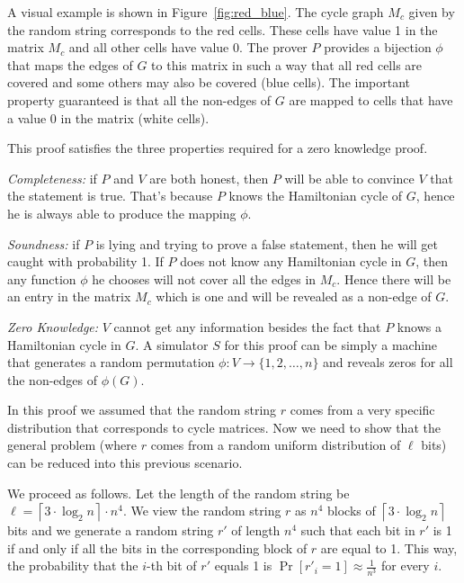 \documentclass[12pt]{tufte-book}
\begin{document}
A visual example is shown in Figure~\ref{fig:red_blue}. The cycle graph $M_c$ given by the
random string corresponds to the red cells. These cells have value 1 in the matrix $M_c$ and
all other cells have value 0. The prover $P$ provides a bijection $\phi$ that
maps the edges of $G$ to this matrix in such a way that all red cells are covered and
some others may also be covered (blue cells). The important property guaranteed is that
all the non-edges of $G$ are mapped to cells that have a value 0 in the matrix (white cells).

This proof satisfies the three properties required for a zero knowledge proof.

\textit{Completeness:} if $P$ and $V$ are both honest, then $P$ will be able to convince
$V$ that the statement is true. That's because $P$ knows the Hamiltonian cycle of $G$,
hence he is always able to produce the mapping $\phi$.

\textit{Soundness:} if $P$ is lying and trying to prove a false statement, then he will
get caught with probability 1. If $P$ does not know any Hamiltonian cycle in $G$, then
any function $\phi$ he chooses will not cover all the edges in $M_c$. Hence there will
be an entry in the matrix $M_c$ which is one and will be revealed as a non-edge of $G$.

\textit{Zero Knowledge:} $V$ cannot get any information besides the fact that $P$
knows a Hamiltonian cycle in $G$. A simulator $S$ for this proof can be simply a machine
that generates a random permutation $\phi:V\rightarrow \{1,2,\ldots,n\}$ and reveals zeros
for all the non-edges of $\phi(G)$.

\vspace{5mm}

In this proof we assumed that the random string $r$ comes from a very specific distribution
that corresponds to cycle matrices.
Now we need to show that the general problem (where $r$ comes from a
random uniform distribution of $\ell$ bits) can be reduced into this previous scenario.

We proceed as follows.
Let the length of the random string be
$\ell=\left\lceil 3\cdot \log_2 n\right\rceil \cdot n^4$.
We view the random string $r$ as $n^4$ blocks of $\left\lceil 3\cdot \log_2 n\right\rceil$
bits and we generate a random string $r'$ of length $n^4$ such that each bit in $r'$
is 1 if and only if all the bits in the corresponding block of $r$ are equal to 1.
This way, the probability that the $i$-th bit of $r'$ equals 1 is $\Pr[r'_i=1]\approx\frac{1}{n^3}$ for every $i$.
\end{document}

